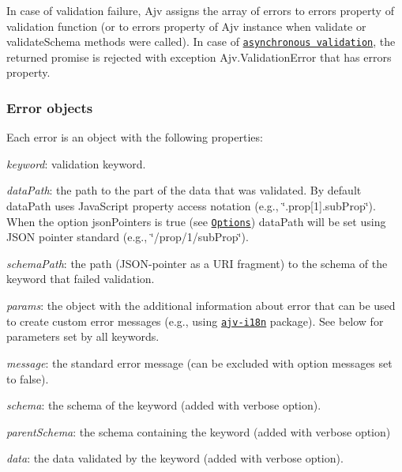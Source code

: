 In case of validation failure, Ajv assigns the array of errors to {\ttfamily errors} property of validation function (or to {\ttfamily errors} property of Ajv instance when {\ttfamily validate} or {\ttfamily validate\+Schema} methods were called). In case of \href{#asynchronous-validation}{\tt asynchronous validation}, the returned promise is rejected with exception {\ttfamily Ajv.\+Validation\+Error} that has {\ttfamily errors} property.

\subsubsection*{Error objects}

Each error is an object with the following properties\+:


\begin{DoxyItemize}
\item {\itshape keyword}\+: validation keyword.
\item {\itshape data\+Path}\+: the path to the part of the data that was validated. By default {\ttfamily data\+Path} uses Java\+Script property access notation (e.\+g., {\ttfamily \char`\"{}.\+prop\mbox{[}1\mbox{]}.\+sub\+Prop\char`\"{}}). When the option {\ttfamily json\+Pointers} is true (see \href{#options}{\tt Options}) {\ttfamily data\+Path} will be set using J\+S\+ON pointer standard (e.\+g., {\ttfamily \char`\"{}/prop/1/sub\+Prop\char`\"{}}).
\item {\itshape schema\+Path}\+: the path (J\+S\+O\+N-\/pointer as a U\+RI fragment) to the schema of the keyword that failed validation.
\item {\itshape params}\+: the object with the additional information about error that can be used to create custom error messages (e.\+g., using \href{https://github.com/epoberezkin/ajv-i18n}{\tt ajv-\/i18n} package). See below for parameters set by all keywords.
\item {\itshape message}\+: the standard error message (can be excluded with option {\ttfamily messages} set to false).
\item {\itshape schema}\+: the schema of the keyword (added with {\ttfamily verbose} option).
\item {\itshape parent\+Schema}\+: the schema containing the keyword (added with {\ttfamily verbose} option)
\item {\itshape data}\+: the data validated by the keyword (added with {\ttfamily verbose} option).
\end{DoxyItemize}

